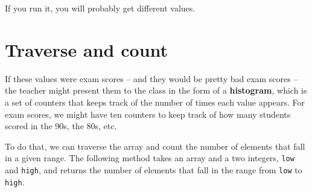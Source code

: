 \documentclass[12pt]{book}
\theoremstyle{exercise}
\newcommand{\java}[1]{\verb"#1"}
\begin{document}
If you run it, you will probably get different values.


\section{Traverse and count}


If these values were exam scores -- and they would be pretty bad exam scores -- the teacher might present them to the class in the form of a {\bf histogram}, which is a set of counters that keeps track of the number of times each value appears.
For exam scores, we might have ten counters to keep track of how many students scored in the 90s, the 80s, etc.







To do that, we can traverse the array and count the number of elements that fall in a given range.
The following method takes an array and a two integers, \java{low} and \java{high}, and returns the number of elements that fall in the range from  \java{low} to \java{high}.
\end{document}
